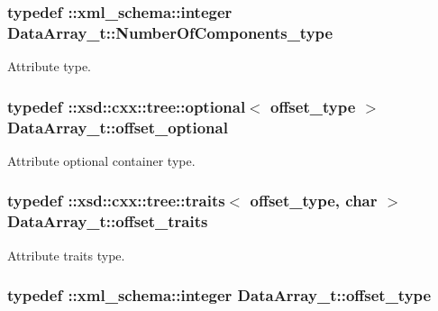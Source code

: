 \subsubsection[{Number\+Of\+Components\+\_\+type}]{\setlength{\rightskip}{0pt plus 5cm}typedef \+::{\bf xml\+\_\+schema\+::integer} {\bf Data\+Array\+\_\+t\+::\+Number\+Of\+Components\+\_\+type}}\label{classDataArray__t_aac602cec132f6e771f7fa3be1d19c16f}


Attribute type. 

\hypertarget{classDataArray__t_a4bc33060e7c386b658c752347ac5f03e}{}
\subsubsection[{offset\+\_\+optional}]{\setlength{\rightskip}{0pt plus 5cm}typedef \+::xsd\+::cxx\+::tree\+::optional$<$ {\bf offset\+\_\+type} $>$ {\bf Data\+Array\+\_\+t\+::offset\+\_\+optional}}\label{classDataArray__t_a4bc33060e7c386b658c752347ac5f03e}


Attribute optional container type. 

\hypertarget{classDataArray__t_a2e3e1a5de665fc64a3d86fd94bb1af0f}{}
\subsubsection[{offset\+\_\+traits}]{\setlength{\rightskip}{0pt plus 5cm}typedef \+::xsd\+::cxx\+::tree\+::traits$<$ {\bf offset\+\_\+type}, char $>$ {\bf Data\+Array\+\_\+t\+::offset\+\_\+traits}}\label{classDataArray__t_a2e3e1a5de665fc64a3d86fd94bb1af0f}


Attribute traits type. 

\hypertarget{classDataArray__t_a7b840c5f08bd2c65cd3c5e24ad132cfb}{}
\subsubsection[{offset\+\_\+type}]{\setlength{\rightskip}{0pt plus 5cm}typedef \+::{\bf xml\+\_\+schema\+::integer} {\bf Data\+Array\+\_\+t\+::offset\+\_\+type}}\label{classDataArray__t_a7b840c5f08bd2c65cd3c5e24ad132cfb}


